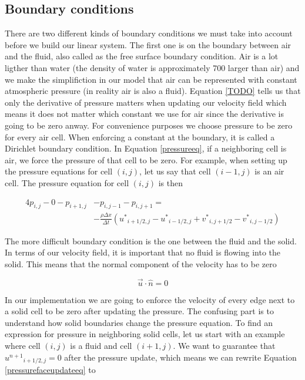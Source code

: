 \subsection{Boundary conditions}

There are two different kinds of boundary conditions we must take into account before we build our linear system. The first one is on the boundary between air and the fluid, also called as the free surface boundary condition. Air is a lot ligther than water (the density of water is approximately 700 larger than air) and we make the simplifiction in our model that air can be represented with constant atmospheric pressure (in reality air is also a fluid). Equation \ref{TODO} tells us that only the derivative of pressure matters when updating our velocity field which means it does not matter which constant we use for air since the derivative is going to be zero anway. For convenience purposes we choose pressure to be zero for every air cell. When enforcing a constant at the boundary, it is called a Dirichlet boundary condition. In Equation \ref{pressureeq}, if a neighboring cell is air, we force the pressure of that cell to be zero. For example, when setting up the pressure equations for cell $(i,j)$, let us say that cell $(i-1, j)$ is an air cell. The pressure equation for cell $(i,j)$ is then

\begin{equation}
\begin{split}
4p_{i,j} - 0 - p_{i+1,j} & - p_{i,j-1} - p_{i,j+1} = \\ &-\frac{\rho \Delta x}{\Delta t}({u^*}_{i+1/2,j} - {u^*}_{i-1/2,j} + {v^*}_{i,j+1/2} - {v^*}_{i,j-1/2})
\end{split}
\label{dirichleteq}
\end{equation}

The more difficult boundary condition is the one between the fluid and the solid. In terms of our velocity field, it is important that no fluid is flowing into the solid. This means that the normal component of the velocity has to be zero

\begin{equation}
\vec{u} \cdot \hat{n} = 0
\end{equation}

In our implementation we are going to enforce the velocity of every edge next to a solid cell to be zero after updating the pressure. The confusing part is to understand how solid boundaries change the pressure equation. To find an expression for pressure in neighboring solid cells, let us start with an example where cell $(i,j)$ is a fluid and cell $(i+1,j)$. We want to guarantee that ${u^{n+1}}_{i+1/2,j} = 0$ after the pressure update, which means we can rewrite Equation \ref{pressurefaceupdateeq} to


